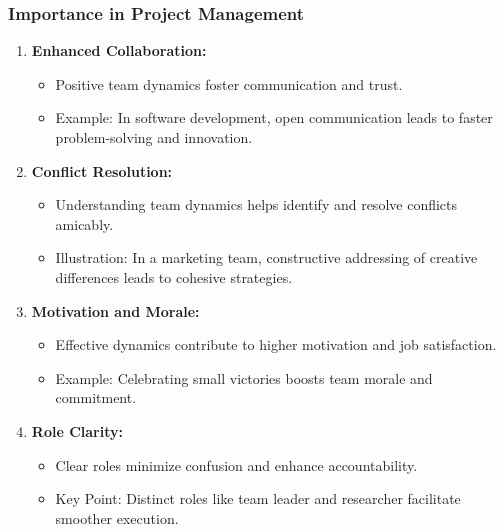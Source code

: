 \documentclass[aspectratio=169]{beamer}
\begin{document}
\begin{frame}[fragile]
    \frametitle{Importance in Project Management}
    \begin{enumerate}
        \item \textbf{Enhanced Collaboration:}
            \begin{itemize}
                \item Positive team dynamics foster communication and trust.
                \item Example: In software development, open communication leads to faster problem-solving and innovation.
            \end{itemize}

        \item \textbf{Conflict Resolution:}
            \begin{itemize}
                \item Understanding team dynamics helps identify and resolve conflicts amicably.
                \item Illustration: In a marketing team, constructive addressing of creative differences leads to cohesive strategies.
            \end{itemize}

        \item \textbf{Motivation and Morale:}
            \begin{itemize}
                \item Effective dynamics contribute to higher motivation and job satisfaction.
                \item Example: Celebrating small victories boosts team morale and commitment.
            \end{itemize}
        
        \item \textbf{Role Clarity:}
            \begin{itemize}
                \item Clear roles minimize confusion and enhance accountability.
                \item Key Point: Distinct roles like team leader and researcher facilitate smoother execution.
            \end{itemize}
    \end{enumerate}
\end{frame}
\end{document}
